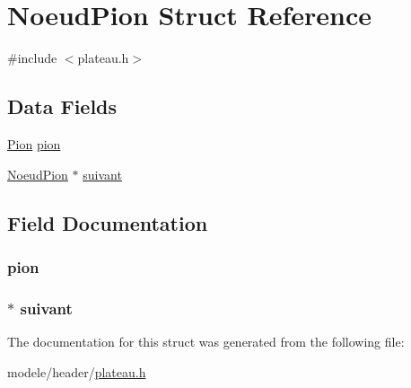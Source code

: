 \hypertarget{struct_noeud_pion}{\section{Noeud\-Pion Struct Reference}
\label{struct_noeud_pion}
}


{\ttfamily \#include $<$plateau.\-h$>$}

\subsection*{Data Fields}
\begin{DoxyCompactItemize}
\item 
\hyperlink{struct_pion}{Pion} \hyperlink{struct_noeud_pion_ad71b3ad38e648f9979a7e37f3ac0c258}{pion}
\item 
\hyperlink{struct_noeud_pion}{Noeud\-Pion} $\ast$ \hyperlink{struct_noeud_pion_a758437ab97d631826bac4cb524ff6275}{suivant}
\end{DoxyCompactItemize}


\subsection{Field Documentation}
\hypertarget{struct_noeud_pion_ad71b3ad38e648f9979a7e37f3ac0c258}{
\subsubsection[{pion}]{ pion}}\label{struct_noeud_pion_ad71b3ad38e648f9979a7e37f3ac0c258}
\hypertarget{struct_noeud_pion_a758437ab97d631826bac4cb524ff6275}{
\subsubsection[{suivant}]{$\ast$ suivant}}\label{struct_noeud_pion_a758437ab97d631826bac4cb524ff6275}


The documentation for this struct was generated from the following file\-:\begin{DoxyCompactItemize}
\item 
modele/header/\hyperlink{plateau_8h}{plateau.\-h}\end{DoxyCompactItemize}
